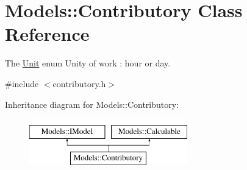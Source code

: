 \hypertarget{classModels_1_1Contributory}{\section{Models\-:\-:Contributory Class Reference}
\label{classModels_1_1Contributory}
}


The \hyperlink{classModels_1_1Unit}{Unit} enum Unity of work \-: hour or day.  




{\ttfamily \#include $<$contributory.\-h$>$}

Inheritance diagram for Models\-:\-:Contributory\-:\begin{figure}[H]
\begin{center}
\leavevmode
\includegraphics[height=2.000000cm]{d5/dd1/classModels_1_1Contributory}
\end{center}
\end{figure}

